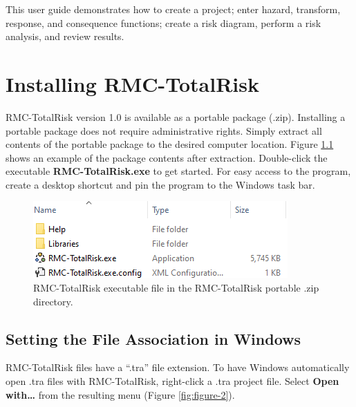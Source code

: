 \documentclass[
]{book}
\begin{document}
This user guide demonstrates how to create a project; enter hazard, transform, response, and consequence functions; create a risk diagram, perform a risk analysis, and review results.

\hypertarget{installation}{%
\chapter{Installing RMC-TotalRisk}\label{installation}}

RMC-TotalRisk version 1.0 is available as a portable package (.zip). Installing a portable package does not require administrative rights. Simply extract all contents of the portable package to the desired computer location. Figure \ref{fig:figure-1} shows an example of the package contents after extraction. Double-click the executable \textbf{RMC-TotalRisk.exe} to get started. For easy access to the program, create a desktop shortcut and pin the program to the Windows task bar.

\begin{figure}

{\centering \includegraphics{images/figure1} 

}

\caption{RMC-TotalRisk executable file in the RMC-TotalRisk portable .zip directory.}\label{fig:figure-1}
\end{figure}

\hypertarget{setting-the-file-association-in-windows}{%
\section{Setting the File Association in Windows}\label{setting-the-file-association-in-windows}}

RMC-TotalRisk files have a ``.tra'' file extension. To have Windows automatically open .tra files with RMC-TotalRisk, right-click a .tra project file. Select \textbf{Open with\ldots{}} from the resulting menu (Figure \ref{fig:figure-2}).
\end{document}
